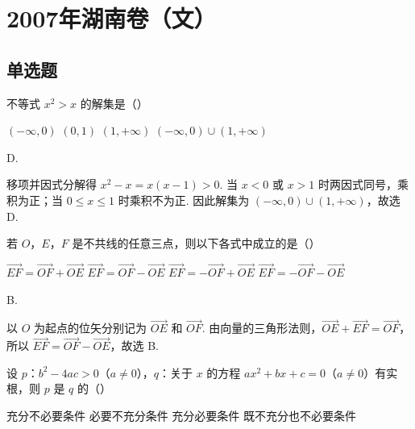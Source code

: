 \chapter{2007年湖南卷（文）}

\section{单选题}

\begin{problem}
不等式 \(x^{2} > x\) 的解集是（\quad）

\choices
    {\((-\infty, 0)\)}
    {\((0, 1)\)}
    {\((1, +\infty)\)}
    {\((-\infty, 0) \cup (1, +\infty)\)}
\end{problem}

\begin{answer}
D.
\end{answer}

\begin{solution}
移项并因式分解得 \(x^{2}-x=x(x-1)>0\). 当 \(x<0\) 或 \(x>1\) 时两因式同号，乘积为正；当 \(0\leqslant x\leqslant1\) 时乘积不为正. 因此解集为 \((-\infty,0)\cup(1,+\infty)\)，故选 D.
\end{solution}

\begin{problem}
若 \(O\)，\(E\)，\(F\) 是不共线的任意三点，则以下各式中成立的是（\quad）

\choices
    {\(\overrightarrow{EF} = \overrightarrow{OF} +\overrightarrow{OE}\)}
    {\(\overrightarrow{EF} = \overrightarrow{OF} -\overrightarrow{OE}\)}
    {\(\overrightarrow{EF} = -\overrightarrow{OF} +\overrightarrow{OE}\)}
    {\(\overrightarrow{EF} = -\overrightarrow{OF} -\overrightarrow{OE}\)}
\end{problem}

\begin{answer}
B.
\end{answer}

\begin{solution}
以 \(O\) 为起点的位矢分别记为 \(\overrightarrow{OE}\) 和 \(\overrightarrow{OF}\). 由向量的三角形法则，\(\overrightarrow{OE}+\overrightarrow{EF}=\overrightarrow{OF}\)，所以 \(\overrightarrow{EF}=\overrightarrow{OF}-\overrightarrow{OE}\)，故选 B.
\end{solution}

\begin{problem}
设 \(p\)：\(b^2 - 4ac > 0\)（\(a \neq 0\)），\(q\)：关于 \(x\) 的方程 \(ax^2 + bx + c = 0\)（\(a \neq 0\)）有实根，则 \(p\) 是 \(q\) 的（\quad）

\choices
    {充分不必要条件}
    {必要不充分条件}
    {充分必要条件}
    {既不充分也不必要条件}
\end{problem}

